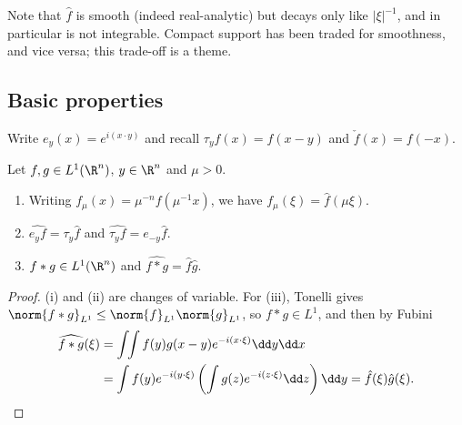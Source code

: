 \begin{example}
\begin{center}
\end{center}
	Note that $\hat f$ is smooth (indeed real-analytic) but decays only like $|\xi|^{-1}$, and in particular is not integrable. Compact support has been traded for smoothness, and vice versa; this trade-off is a theme.
\end{example}

\subsection{Basic properties}

Write $e_y(x) = e^{i(x\cdot y)}$ and recall $\tau_y f(x) = f(x-y)$ and $\check f(x) = f(-x)$.

\begin{lemma}\label{lem:ftbasic}
	Let $f, g \in L^1(\R^n)$, $y \in \R^n$ and $\mu > 0$.
	\begin{enumerate}[label=(\roman*)]
		\item Writing $f_\mu(x) = \mu^{-n}f(\mu^{-1}x)$, we have $\widehat{f_\mu}(\xi) = \hat f(\mu\xi)$.
		\item $\widehat{e_y f} = \tau_y \hat f$ and $\widehat{\tau_y f} = e_{-y}\hat f$.
		\item $f * g \in L^1(\R^n)$ and $\widehat{f*g} = \hat f \hat g$.
	\end{enumerate}
\end{lemma}

\begin{proof}
	(i) and (ii) are changes of variable. For (iii), Tonelli gives $\norm{f*g}_{L^1}\le\norm{f}_{L^1}\norm{g}_{L^1}$, so $f * g \in L^1$, and then by Fubini
	\begin{align*}
		\widehat{f*g}(\xi) &= \int\!\!\int f(y)g(x-y)e^{-i(x\cdot\xi)}\dd y \dd x \\
		&= \int f(y)e^{-i(y\cdot\xi)}\left( \int g(z)e^{-i(z\cdot\xi)}\dd z\right)\dd y = \hat f(\xi)\hat g(\xi). \qedhere
	\end{align*}
\end{proof}

